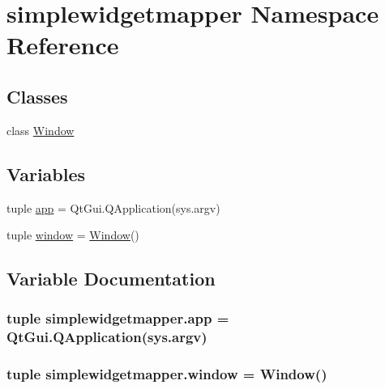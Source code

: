 \hypertarget{namespacesimplewidgetmapper}{}\section{simplewidgetmapper Namespace Reference}
\label{namespacesimplewidgetmapper}
\subsection*{Classes}
\begin{DoxyCompactItemize}
\item 
class \hyperlink{classsimplewidgetmapper_1_1Window}{Window}
\end{DoxyCompactItemize}
\subsection*{Variables}
\begin{DoxyCompactItemize}
\item 
tuple \hyperlink{namespacesimplewidgetmapper_af4d18e83f4e9cc5474381686381544fa}{app} = Qt\+Gui.\+Q\+Application(sys.\+argv)
\item 
tuple \hyperlink{namespacesimplewidgetmapper_af8698bf260322ed3ca6227c84bb99903}{window} = \hyperlink{classsimplewidgetmapper_1_1Window}{Window}()
\end{DoxyCompactItemize}


\subsection{Variable Documentation}
\hypertarget{namespacesimplewidgetmapper_af4d18e83f4e9cc5474381686381544fa}{}
\subsubsection[{app}]{\setlength{\rightskip}{0pt plus 5cm}tuple simplewidgetmapper.\+app = Qt\+Gui.\+Q\+Application(sys.\+argv)}\label{namespacesimplewidgetmapper_af4d18e83f4e9cc5474381686381544fa}
\hypertarget{namespacesimplewidgetmapper_af8698bf260322ed3ca6227c84bb99903}{}
\subsubsection[{window}]{\setlength{\rightskip}{0pt plus 5cm}tuple simplewidgetmapper.\+window = {\bf Window}()}\label{namespacesimplewidgetmapper_af8698bf260322ed3ca6227c84bb99903}
